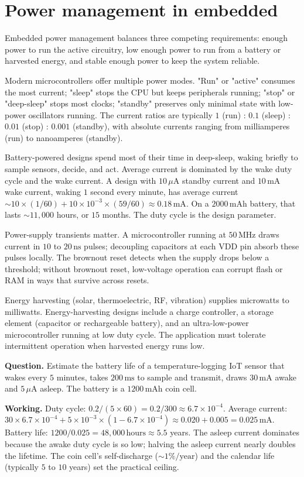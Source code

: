 \section{Power management in embedded}

Embedded power management balances three competing requirements: enough power to run the active circuitry, low enough power to run from a battery or harvested energy, and stable enough power to keep the system reliable.

Modern microcontrollers offer multiple power modes. "Run" or "active" consumes the most current; "sleep" stops the CPU but keeps peripherals running; "stop" or "deep-sleep" stops most clocks; "standby" preserves only minimal state with low-power oscillators running. The current ratios are typically $1$ (run) : $0.1$ (sleep) : $0.01$ (stop) : $0.001$ (standby), with absolute currents ranging from milliamperes (run) to nanoamperes (standby).

Battery-powered designs spend most of their time in deep-sleep, waking briefly to sample sensors, decide, and act. Average current is dominated by the wake duty cycle and the wake current. A design with $10\,\mu\text{A}$ standby current and $10\,\text{mA}$ wake current, waking $1$ second every minute, has average current $\sim 10 \times (1/60) + 10 \times 10^{-3} \times (59/60) \approx 0.18\,\text{mA}$. On a $2000\,\text{mAh}$ battery, that lasts $\sim 11{,}000$ hours, or $15$ months. The duty cycle is the design parameter.

Power-supply transients matter. A microcontroller running at $50\,\text{MHz}$ draws current in $10$ to $20\,\text{ns}$ pulses; decoupling capacitors at each VDD pin absorb these pulses locally. The brownout reset detects when the supply drops below a threshold; without brownout reset, low-voltage operation can corrupt flash or RAM in ways that survive across resets.

Energy harvesting (solar, thermoelectric, RF, vibration) supplies microwatts to milliwatts. Energy-harvesting designs include a charge controller, a storage element (capacitor or rechargeable battery), and an ultra-low-power microcontroller running at low duty cycle. The application must tolerate intermittent operation when harvested energy runs low.

\begin{estimation}
\textbf{Question.} Estimate the battery life of a temperature-logging IoT sensor that wakes every $5$ minutes, takes $200\,\text{ms}$ to sample and transmit, draws $30\,\text{mA}$ awake and $5\,\mu\text{A}$ asleep. The battery is a $1200\,\text{mAh}$ coin cell.

\textbf{Working.} Duty cycle: $0.2/(5 \times 60) = 0.2/300 \approx 6.7 \times 10^{-4}$. Average current: $30 \times 6.7 \times 10^{-4} + 5 \times 10^{-3} \times (1 - 6.7 \times 10^{-4}) \approx 0.020 + 0.005 = 0.025\,\text{mA}$. Battery life: $1200/0.025 = 48{,}000\,\text{hours} \approx 5.5$ years. The asleep current dominates because the awake duty cycle is so low; halving the asleep current nearly doubles the lifetime. The coin cell's self-discharge ($\sim 1\%/\text{year}$) and the calendar life (typically $5$ to $10$ years) set the practical ceiling.
\end{estimation}

